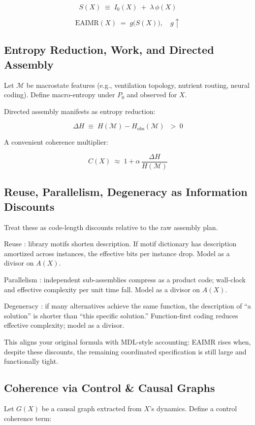 \documentclass{article}
\begin{document}
\[S(X) \;\equiv\; I_{0}(X)\;+\;\lambda\, \phi(X)\]

\[\text{EAIMR}(X) \;=\; g\big(S(X)\big),\quad g\uparrow\]

\subsection{Entropy Reduction, Work, and Directed Assembly}

Let \(\mathcal{M}\) be macrostate features (e.g., ventilation topology, nutrient routing, neural coding). Define macro-entropy under \(P_0\) and observed for \(X\).

Directed assembly manifests as entropy reduction:

\[\Delta H \;\equiv\; H(\mathcal{M}) - H_\text{obs}(\mathcal{M}) \;\;>\; 0\]

A convenient coherence multiplier:

\[C(X) \;\approx\; 1 + \alpha \,\frac{\Delta H}{H(\mathcal{M})}\]

\subsection{Reuse, Parallelism, Degeneracy as Information Discounts}

Treat these as code-length discounts relative to the raw assembly plan.

Reuse : library motifs shorten description. If motif dictionary has description amortized across instances, the effective bits per instance drop. Model as a divisor on \(A(X)\).

Parallelism : independent sub-assemblies compress as a product code; wall-clock and effective complexity per unit time fall. Model as a divisor on \(A(X)\).

Degeneracy : if many alternatives achieve the same function, the description of “a solution” is shorter than “this specific solution.” Function-first coding reduces effective complexity; model as a divisor.

This aligns your original formula with MDL-style accounting: EAIMR rises when, despite these discounts, the remaining coordinated specification is still large and functionally tight.

\subsection{Coherence via Control \& Causal Graphs}

Let \(G(X)\) be a causal graph extracted from \(X\)'s dynamics. Define a control coherence term:
\end{document}
